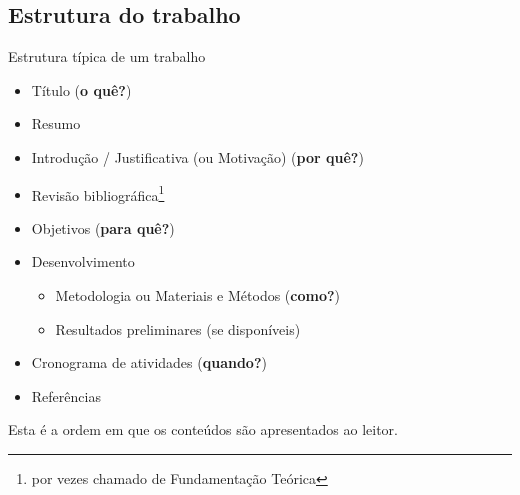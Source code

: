 \documentclass{beamer}
\begin{document}


\subsection{Estrutura do trabalho}

\begin{frame}{Estrutura típica de um trabalho}
  \begin{itemize}
    \footnotesize
  \item<1-> Título (\alert{{\bf o quê?}})
  \item<2-> Resumo
  \item<2-> Introdução / Justificativa (ou Motivação) (\alert{{\bf por quê?}})
  \item<2-> Revisão bibliográfica\footnote{por vezes chamado
      de Fundamentação Teórica}
  \item<2-> Objetivos (\alert{{\bf para quê?}})
  \item<3-> Desenvolvimento
    \begin{itemize}
      \scriptsize
    \item<3-> Metodologia ou Materiais e Métodos (\alert{{\bf como?}})
    \item<3-> Resultados preliminares (se disponíveis)
    \end{itemize}
  \item<4-> Cronograma de atividades (\alert{{\bf quando?}})
  \item<4-> Referências
  \end{itemize}

  \vfill
  \scriptsize
  Esta é a ordem em que os conteúdos são apresentados ao leitor.
\end{frame}
\end{document}
